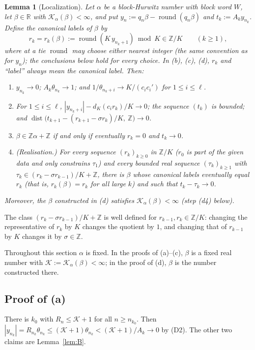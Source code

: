 \documentclass[11pt]{amsart}
\newtheorem{lemma}[theorem]{Lemma}
\theoremstyle{definition}
\theoremstyle{remark}
\newcommand{\Z}{\mathbb{Z}}
\newcommand{\R}{\mathbb{R}}
\newcommand{\KL}{\mathcal{K}}
\newcommand{\rnd}{\operatorname{round}}
\newcommand{\dZ}{\operatorname{dist}}
\begin{document}
\begin{lemma}[Localization]\label{lem:S1}
Let $\alpha$ be a block-Hurwitz number with block word $W$, let $\beta\in\R$ with $\KL_\alpha(\beta)<\infty$, and put
$y_n:=q_n\beta-\rnd(q_n\beta)$ and $t_k:=A_ky_{n_k}$. Define the \emph{canonical labels} of $\beta$ by
\[
r_k=r_k(\beta):=\rnd(K\,y_{n_k+1})\bmod K\in\Z/K\qquad(k\ge1),
\]
where at a tie $\rnd$ may choose either nearest integer (the same convention as for $y_n$); the conclusions
below hold for every choice. In (b), (c), (d), $r_k$ and ``label'' always mean the canonical label. Then:
\begin{enumerate}
\item[(a)] $y_{n_k}\to0$; $A_k\theta_{n_k}\to1$; and $1/\theta_{n_k+i}\to K/(c_ic_i')$ for $1\le i\le\ell$.
\item[(b)] For $1\le i\le\ell$, $|y_{n_k+i}|-d_K(c_ir_k)/K\to0$; the sequence $(t_k)$ is bounded; and
$\dZ\bigl(t_{k+1}-(r_{k+1}-\sigma r_k)/K,\ \Z\bigr)\to0$.
\item[(c)] $\beta\in\Z\alpha+\Z$ if and only if eventually $r_k=0$ and $t_k\to0$.
\item[(d)] (Realisation.) For every sequence $(r_k)_{k\ge0}$ in $\Z/K$ ($r_0$ is part of the given data and only
constrains $\tau_1$) and every bounded real sequence $(\tau_k)_{k\ge1}$ with
$\tau_k\in(r_k-\sigma r_{k-1})/K+\Z$, there is $\beta$ whose canonical labels eventually equal $r_k$ (that is,
$r_k(\beta)=r_k$ for all large $k$) and such that $t_k-\tau_k\to0$.
\end{enumerate}
Moreover, the $\beta$ constructed in (d) satisfies $\KL_\alpha(\beta)<\infty$ (step (d4) below).
\end{lemma}
The class $(r_k-\sigma r_{k-1})/K+\Z$ is well defined for $r_{k-1},r_k\in\Z/K$: changing the representative of
$r_k$ by $K$ changes the quotient by $1$, and changing that of $r_{k-1}$ by $K$ changes it by $\sigma\in\Z$.

Throughout this section $\alpha$ is fixed. In the proofs of (a)--(c), $\beta$ is a fixed real number with
$\KL:=\KL_\alpha(\beta)<\infty$; in the proof of (d), $\beta$ is the number constructed there.

\subsection{Proof of (a)}
There is $k_0$ with $R_n\le\KL+1$ for all $n\ge n_{k_0}$. Then
$|y_{n_k}|=R_{n_k}\theta_{n_k}\le(\KL+1)\theta_{n_k}<(\KL+1)/A_k\to0$ by (D2). The other two claims are
Lemma~\ref{lem:B}.
\end{document}

